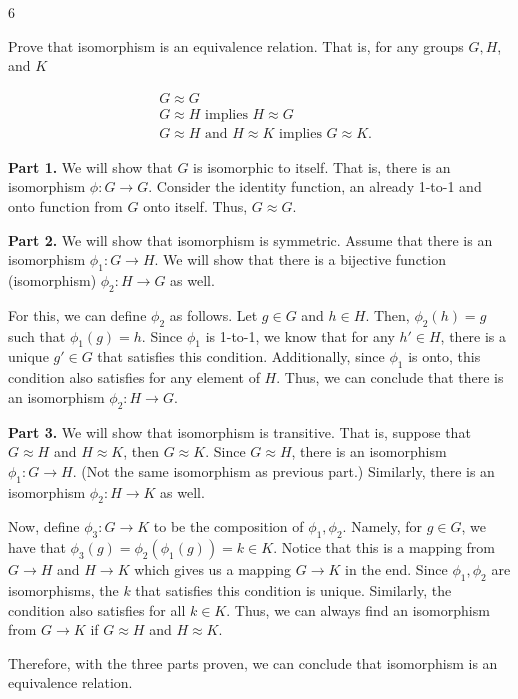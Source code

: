 \begin{hwproblem}
{6}{
    Prove that isomorphism is an equivalence relation. That is, for any groups $G, H$, and $K$

$$
\begin{aligned}
& G \approx G \\
& G \approx H \text { implies } H \approx G \\
& G \approx H \text { and } H \approx K \text { implies } G \approx K .
\end{aligned}
$$
}

\noindent\textbf{Part 1.} We will show that \(G\) is isomorphic to itself. That is, there is an isomorphism \(\phi: G \to G\). Consider the identity function, an already 1-to-1 and onto function from \(G\) onto itself. Thus, \(G \approx G\).

\noindent\textbf{Part 2.} We will show that isomorphism is symmetric. Assume that there is an isomorphism \(\phi_1 : G \to H\). We will show that there is a bijective function (isomorphism) \(\phi_2 : H \to G\) as well.

For this, we can define \(\phi_2\) as follows. Let \(g \in G\) and \(h \in H\). Then, \(\phi_2(h) = g\) such that \(\phi_1(g) = h\). Since \(\phi_1\) is 1-to-1, we know that for any \(h' \in H\), there is a unique \(g' \in G\) that satisfies this condition. Additionally, since \(\phi_1\) is onto, this condition also satisfies for any element of \(H\). Thus, we can conclude that there is an isomorphism \(\phi_2 : H \to G\).

\noindent\textbf{Part 3.} We will show that isomorphism is transitive. That is, suppose that \(G \approx H\) and \(H \approx K\), then \(G \approx K\). Since \(G \approx H\), there is an isomorphism \(\phi_1 : G \to H\). (Not the same isomorphism as previous part.) Similarly, there is an isomorphism \(\phi_2 : H \to K\) as well.

Now, define \(\phi_3 : G \to K\) to be the composition of \(\phi_1, \phi_2\). Namely, for \(g \in G\), we have that \(\phi_3(g) = \phi_2(\phi_1(g)) = k \in K\). Notice that this is a mapping from \(G \to H\) and \(H \to K\) which gives us a mapping \(G \to K\) in the end. Since \(\phi_1, \phi_2\) are isomorphisms, the \(k\) that satisfies this condition is unique. Similarly, the condition also satisfies for all \(k \in K\). Thus, we can always find an isomorphism from \(G \to K\) if \(G \approx H\) and \(H \approx K\).

Therefore, with the three parts proven, we can conclude that isomorphism is an equivalence relation.
\end{hwproblem}


